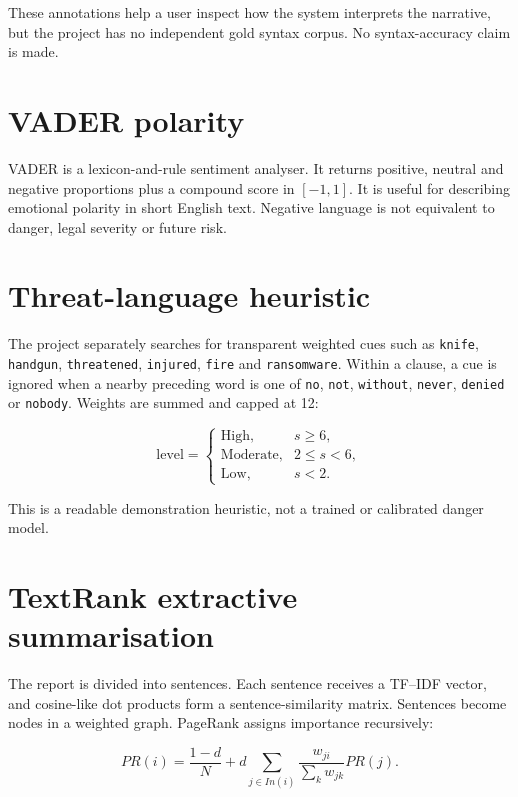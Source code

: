 \documentclass[12pt,a4paper]{report}
\newcommand{\code}[1]{\texttt{#1}}
\begin{document}
These annotations help a user inspect how the system interprets the narrative, but the project has no independent gold syntax corpus. No syntax-accuracy claim is made.

\section{VADER polarity}

VADER is a lexicon-and-rule sentiment analyser. It returns positive, neutral and negative proportions plus a compound score in $[-1,1]$. It is useful for describing emotional polarity in short English text. Negative language is not equivalent to danger, legal severity or future risk.

\section{Threat-language heuristic}

The project separately searches for transparent weighted cues such as \code{knife}, \code{handgun}, \code{threatened}, \code{injured}, \code{fire} and \code{ransomware}. Within a clause, a cue is ignored when a nearby preceding word is one of \code{no}, \code{not}, \code{without}, \code{never}, \code{denied} or \code{nobody}. Weights are summed and capped at 12:

\begin{equation}
\text{level}=\begin{cases}
\text{High},&s\geq6,\\
\text{Moderate},&2\leq s<6,\\
\text{Low},&s<2.
\end{cases}
\end{equation}

This is a readable demonstration heuristic, not a trained or calibrated danger model.

\section{TextRank extractive summarisation}

The report is divided into sentences. Each sentence receives a TF--IDF vector, and cosine-like dot products form a sentence-similarity matrix. Sentences become nodes in a weighted graph. PageRank assigns importance recursively:

\begin{equation}
PR(i)=\frac{1-d}{N}+d\sum_{j\in In(i)}\frac{w_{ji}}{\sum_k w_{jk}}PR(j).
\end{equation}
\end{document}
